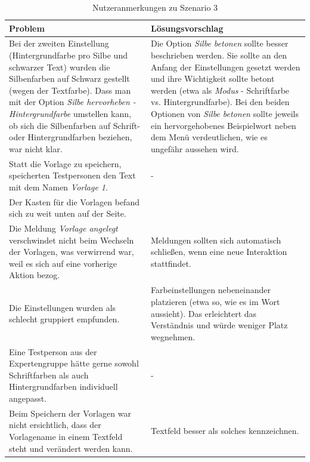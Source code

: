 \begin{table}[h!]
	\centering
	\begin{tabular}{|p{}|p{}|}
		\hline
		\textbf{Problem} & \textbf{Lösungsvorschlag}\\
		\hline
		\hline
		Bei der zweiten Einstellung (Hintergrundfarbe pro Silbe und schwarzer Text) wurden die Silbenfarben auf Schwarz gestellt (wegen der Textfarbe). Dass man mit der Option \textit{Silbe hervorheben - Hintergrundfarbe} umstellen kann, ob sich die Silbenfarben auf Schrift- oder Hintergrundfarben beziehen, war nicht klar. & Die Option \textit{Silbe betonen} sollte besser beschrieben werden. Sie sollte an den Anfang der Einstellungen gesetzt werden und ihre Wichtigkeit sollte betont werden (etwa als \textit{Modus} - Schriftfarbe vs. Hintergrundfarbe). Bei den beiden Optionen von \textit{Silbe betonen} sollte jeweils ein hervorgehobenes Beispielwort neben dem Menü verdeutlichen, wie es ungefähr aussehen wird.\\
		\hline
		Statt die Vorlage zu speichern, speicherten Testpersonen den Text mit dem Namen \textit{Vorlage 1}. & -\\
		\hline
		Der Kasten für die Vorlagen befand sich zu weit unten auf der Seite. & \\
		\hline
		Die Meldung \textit{Vorlage angelegt} verschwindet nicht beim Wechseln der Vorlagen, was verwirrend war, weil es sich auf eine vorherige Aktion bezog. & Meldungen sollten sich automatisch schließen, wenn eine neue Interaktion stattfindet.\\
		\hline
		Die Einstellungen wurden als schlecht gruppiert empfunden.  & Farbeinstellungen nebeneinander platzieren (etwa so, wie es im Wort aussieht). Das erleichtert das Verständnis und würde weniger Platz wegnehmen.\\
		\hline
		Eine Testperson aus der Expertengruppe hätte gerne sowohl Schriftfarben als auch Hintergrundfarben individuell angepasst. & -\\
		\hline
		Beim Speichern der Vorlagen war nicht ersichtlich, dass der Vorlagename in einem Textfeld steht und verändert werden kann. & Textfeld besser als solches kennzeichnen.\\
		\hline
	\end{tabular}
	\caption{Nutzeranmerkungen zu Szenario 3}
	\label{table:szenario3}
\end{table}
\newpage

